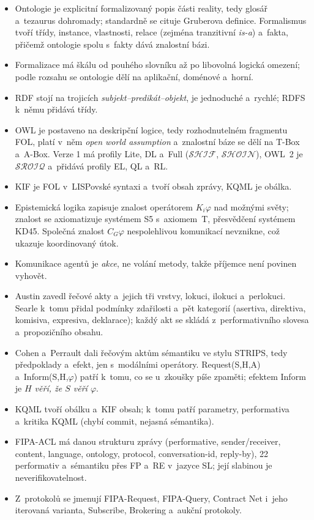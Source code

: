 \documentclass[11pt,a4paper]{article}
\theoremstyle{definition}
\begin{document}
\begin{itemize}
\item Ontologie je explicitní formalizovaný popis části reality, tedy glosář a~tezaurus
  dohromady; standardně se cituje Gruberova definice. Formalismus tvoří třídy, instance,
  vlastnosti, relace (zejména tranzitivní \emph{is-a}) a~fakta, přičemž ontologie spolu s~fakty
  dává znalostní bázi.
\item Formalizace má škálu od pouhého slovníku až po libovolná logická omezení; podle rozsahu se
  ontologie dělí na aplikační, doménové a~horní.
\item RDF stojí na trojicích \emph{subjekt--predikát--objekt}, je jednoduché a~rychlé; RDFS
  k~němu přidává třídy.
\item OWL je postaveno na deskripční logice, tedy rozhodnutelném fragmentu FOL, platí v~něm
  \emph{open world assumption} a~znalostní báze se dělí na T-Box a~A-Box. Verze 1 má profily
  Lite, DL a~Full ($\mathcal{SHIF}$, $\mathcal{SHOIN}$), OWL~2 je $\mathcal{SROIQ}$ a~přidává
  profily EL, QL a~RL.
\item KIF je FOL v~LISPovské syntaxi a~tvoří obsah zprávy, KQML je obálka.
\item Epistemická logika zapisuje znalost operátorem $K_i\varphi$ nad možnými světy; znalost se
  axiomatizuje systémem S5 s~axiomem~T, přesvědčení systémem KD45. Společná znalost $C_G\varphi$
  nespolehlivou komunikací nevznikne, což ukazuje koordinovaný útok.
\item Komunikace agentů je \emph{akce}, ne volání metody, takže příjemce není povinen vyhovět.
\item Austin zavedl řečové akty a~jejich tři vrstvy, lokuci, ilokuci a~perlokuci. Searle k~tomu
  přidal podmínky zdařilosti a~pět kategorií (asertiva, direktiva, komisiva, expresiva,
  deklarace); každý akt se skládá z~performativního slovesa a~propozičního obsahu.
\item Cohen a~Perrault dali řečovým aktům sémantiku ve stylu STRIPS, tedy předpoklady a~efekt,
  jen s~modálními operátory. Request(S,H,A) a~Inform(S,H,$\varphi$) patří k~tomu, co se
  u~zkoušky píše zpaměti; efektem Inform je \emph{$H$ věří, že $S$ věří $\varphi$}.
\item KQML tvoří obálku a~KIF obsah; k~tomu patří parametry, performativa a~kritika KQML
  (chybí commit, nejasná sémantika).
\item FIPA-ACL má danou strukturu zprávy (performative, sender/receiver, content, language,
  ontology, protocol, conversation-id, reply-by), 22 performativ a~sémantiku přes FP a~RE
  v~jazyce SL; její slabinou je neverifikovatelnost.
\item Z~protokolů se jmenují FIPA-Request, FIPA-Query, Contract Net i~jeho iterovaná varianta,
  Subscribe, Brokering a~aukční protokoly.
\end{itemize}
\end{document}
